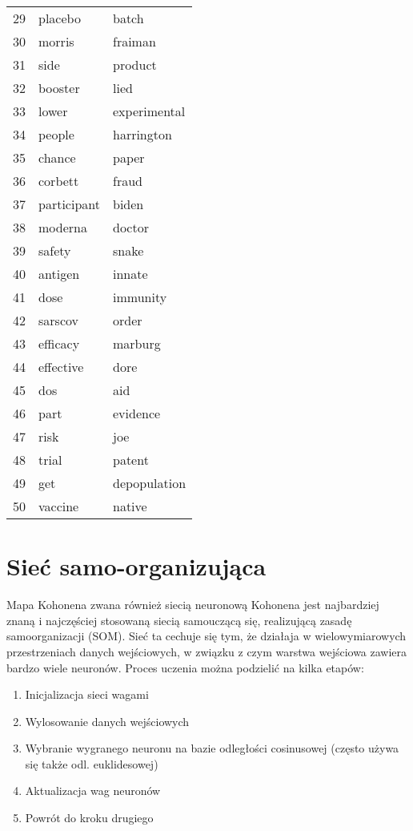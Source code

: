 \documentclass[11pt]{article}
\begin{document}
\begin{table}[H]
\begin{tabular}{|l|l|l|}
    29 & placebo           & batch         \\
    30 & morris            & fraiman       \\
    31 & side              & product       \\
    32 & booster           & lied          \\
    33 & lower             & experimental  \\
    34 & people            & harrington    \\
    35 & chance            & paper         \\
    36 & corbett           & fraud         \\
    37 & participant       & biden         \\
    38 & moderna           & doctor        \\
    39 & safety            & snake         \\
    40 & antigen           & innate        \\
    41 & dose              & immunity      \\
    42 & sarscov           & order         \\
    43 & efficacy          & marburg       \\
    44 & effective         & dore          \\
    45 & dos               & aid           \\
    46 & part              & evidence      \\
    47 & risk              & joe           \\
    48 & trial             & patent        \\
    49 & get               & depopulation  \\
    50 & vaccine           & native       
    \end{tabular}
\end{table}
    
\section*{Sieć samo-organizująca}

Mapa Kohonena zwana również siecią neuronową Kohonena jest najbardziej znaną i najczęściej 
stosowaną siecią samouczącą się, realizującą zasadę samoorganizacji (SOM). Sieć ta 
cechuje się tym, że działaja w wielowymiarowych przestrzeniach danych wejściowych, 
w związku z czym warstwa wejściowa zawiera bardzo wiele neuronów. Proces uczenia 
można podzielić na kilka etapów:
\begin{enumerate}
    \item Inicjalizacja sieci wagami
    \item Wylosowanie danych wejściowych
    \item Wybranie wygranego neuronu na bazie odległości cosinusowej (często używa się także odl. euklidesowej)
    \item Aktualizacja wag neuronów
    \item Powrót do kroku drugiego 
\end{enumerate}
\end{document}
